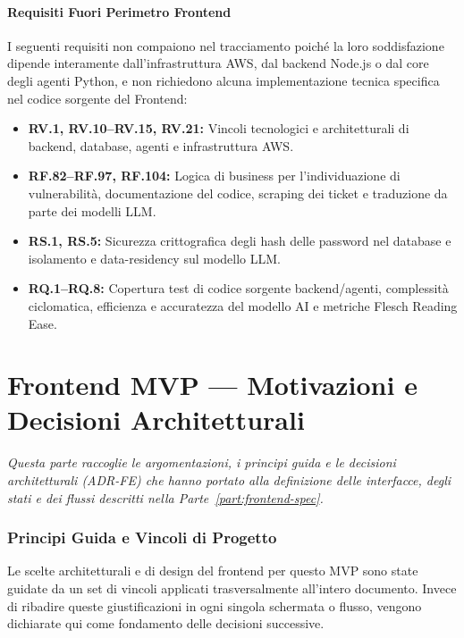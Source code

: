 \documentclass[11pt,a4paper]{article}
\begin{document}
\subsection{Requisiti Fuori Perimetro Frontend}

I seguenti requisiti non compaiono nel tracciamento poiché la loro soddisfazione dipende interamente dall'infrastruttura AWS, dal backend Node.js o dal core degli agenti Python, e non richiedono alcuna implementazione tecnica specifica nel codice sorgente del Frontend:

\begin{itemize}
    \item \textbf{RV.1, RV.10--RV.15, RV.21:} Vincoli tecnologici e architetturali di backend, database, agenti e infrastruttura AWS.
    \item \textbf{RF.82--RF.97, RF.104:} Logica di business per l'individuazione di vulnerabilità, documentazione del codice, scraping dei ticket e traduzione da parte dei modelli LLM.
    \item \textbf{RS.1, RS.5:} Sicurezza crittografica degli hash delle password nel database e isolamento e data-residency sul modello LLM.
    \item \textbf{RQ.1--RQ.8:} Copertura test di codice sorgente backend/agenti, complessità ciclomatica, efficienza e accuratezza del modello AI e metriche Flesch Reading Ease.
\end{itemize}

\part{Frontend MVP --- Motivazioni e Decisioni Architetturali}
\label{part:frontend-adr}

\emph{Questa parte raccoglie le argomentazioni, i principi guida e le decisioni architetturali (ADR-FE) che hanno portato alla definizione delle interfacce, degli stati e dei flussi descritti nella Parte~\ref{part:frontend-spec}.}

\section{Principi Guida e Vincoli di Progetto}

Le scelte architetturali e di design del frontend per questo MVP sono state guidate da un set di vincoli applicati trasversalmente all'intero documento. Invece di ribadire queste giustificazioni in ogni singola schermata o flusso, vengono dichiarate qui come fondamento delle decisioni successive.
\end{document}
